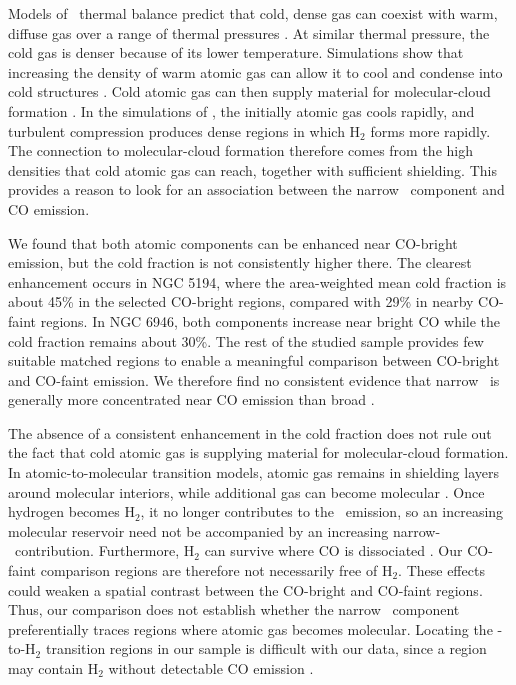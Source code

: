 Models of \HI\ thermal balance predict that cold, dense gas can coexist with warm, diffuse gas over a range of thermal pressures \citep{Wolfire2003}. At similar thermal pressure, the cold gas is denser because of its lower temperature. Simulations show that increasing the density of warm atomic gas can allow it to cool and condense into cold structures \citep{Saury2014}. Cold atomic gas can then supply material for molecular-cloud formation \citep{Krumholz2009Transition}.
In the simulations of \citet{GloverMacLow2007}, the initially atomic gas cools rapidly, and turbulent compression produces dense regions in which H$_2$ forms more rapidly. The connection to molecular-cloud formation therefore comes from the high densities that cold atomic gas can reach, together with sufficient shielding. This provides a reason to look for an association between the narrow \HI\ component and CO emission.

We found that both atomic components can be enhanced near CO-bright emission, but the cold fraction is not consistently higher there. The clearest enhancement occurs in NGC 5194, where the area-weighted mean cold fraction is about 45\% in the selected CO-bright regions, compared with 29\% in nearby CO-faint regions. In NGC 6946, both components increase near bright CO while the cold fraction remains about 30\%. The rest of the studied sample provides few suitable matched regions to enable a meaningful comparison between CO-bright and CO-faint emission. We therefore find no consistent evidence that narrow \HI\ is generally more concentrated near CO emission than broad \HI.

The absence of a consistent enhancement in the cold fraction does not rule out the fact that cold atomic gas is supplying material for molecular-cloud formation. In atomic-to-molecular transition models, atomic gas remains in shielding layers around molecular interiors, while additional gas can become molecular \citep{Krumholz2009Transition,Sternberg2014}. Once hydrogen becomes H$_2$, it no longer contributes to the \HI\ emission, so an increasing molecular reservoir need not be accompanied by an increasing narrow-\HI\ contribution. Furthermore, H$_2$ can survive where CO is dissociated \citep{Wolfire2010}. Our CO-faint comparison regions are therefore not necessarily free of H$_2$. These effects could weaken a spatial contrast between the CO-bright and CO-faint regions. Thus, our comparison does not establish whether the narrow \HI\ component preferentially traces regions where atomic gas becomes molecular. Locating the \HI-to-H$_2$ transition regions in our sample is difficult with our data, since a region may contain H$_2$ without detectable CO emission \citep{Wolfire2010}.

